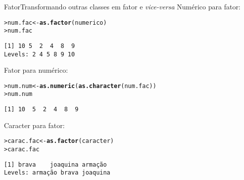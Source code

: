 \documentclass[10pt,handout]{beamer}\usepackage{graphicx, color}
\makeatletter
\newcommand{\hlfunctioncall}[1]{\textcolor[rgb]{0,0,0.545098039215686}{\textbf{#1}}}%
\newenvironment{kframe}{%
 \def\at@end@of@kframe{}%
 \ifinner\ifhmode%
  \def\at@end@of@kframe{\end{minipage}}%
  \begin{minipage}{\columnwidth}%
 \fi\fi%
 \def\FrameCommand##1{\hskip\@totalleftmargin \hskip-\fboxsep
 \colorbox{shadecolor}{##1}\hskip-\fboxsep
     \hskip-\linewidth \hskip-\@totalleftmargin \hskip\columnwidth}%
 \MakeFramed {\advance\hsize-\width
   \@totalleftmargin\z@ \linewidth\hsize
   \@setminipage}}%
 {\par\unskip\endMakeFramed%
 \at@end@of@kframe}
\newenvironment{knitrout}{}{} %
\makeatother
\begin{document}
\begin{frame}[fragile=singleslide]{Fator}{Transformando outras classes
    em fator e \textit{vice-versa}}
Numérico para fator:
\begin{knitrout}\small
{}\color{fgcolor}\begin{kframe}
\begin{alltt}
> num.fac <- \hlfunctioncall{as.factor}(numerico)
> num.fac
\end{alltt}
\begin{verbatim}
[1] 10 5  2  4  8  9 
Levels: 2 4 5 8 9 10
\end{verbatim}
\end{kframe}
\end{knitrout}

Fator para numérico:
\begin{knitrout}\small
{}\color{fgcolor}\begin{kframe}
\begin{alltt}
> num.num <- \hlfunctioncall{as.numeric}(\hlfunctioncall{as.character}(num.fac))
> num.num
\end{alltt}
\begin{verbatim}
[1] 10  5  2  4  8  9
\end{verbatim}
\end{kframe}
\end{knitrout}

Caracter para fator:
\begin{knitrout}\small
{}\color{fgcolor}\begin{kframe}
\begin{alltt}
> carac.fac <- \hlfunctioncall{as.factor}(caracter)
> carac.fac
\end{alltt}
\begin{verbatim}
[1] brava    joaquina armação 
Levels: armação brava joaquina
\end{verbatim}
\end{kframe}
\end{knitrout}

\end{frame}
\end{document}
